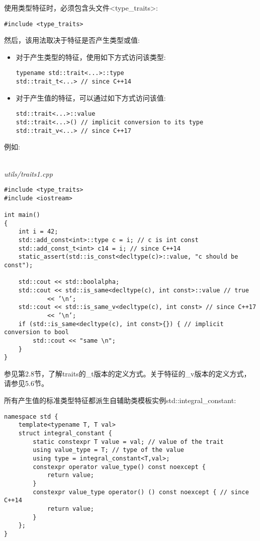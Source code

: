 
使用类型特征时，必须包含头文件<type\_traits>:

\begin{lstlisting}[style=styleCXX]
#include <type_traits>
\end{lstlisting}

然后，该用法取决于特征是否产生类型或值:

\begin{itemize}
\item 
对于产生类型的特征，使用如下方式访问该类型:
\begin{lstlisting}[style=styleCXX]
typename std::trait<...>::type
std::trait_t<...> // since C++14
\end{lstlisting}

\item 
对于产生值的特征，可以通过如下方式访问该值:
\begin{lstlisting}[style=styleCXX]
std::trait<...>::value
std::trait<...>() // implicit conversion to its type
std::trait_v<...> // since C++17
\end{lstlisting}
\end{itemize}

例如:

\hspace*{\fill} \\ %
\noindent
\textit{utils/traits1.cpp}
\begin{lstlisting}[style=styleCXX]
#include <type_traits>
#include <iostream>

int main()
{
	int i = 42;
	std::add_const<int>::type c = i; // c is int const
	std::add_const_t<int> c14 = i; // since C++14
	static_assert(std::is_const<decltype(c)>::value, "c should be const");
	
	std::cout << std::boolalpha;
	std::cout << std::is_same<decltype(c), int const>::value // true
			<< ’\n’;
	std::cout << std::is_same_v<decltype(c), int const> // since C++17
			<< ’\n’;
	if (std::is_same<decltype(c), int const>{}) { // implicit conversion to bool
		std::cout << "same \n";
	}
}
\end{lstlisting}

参见第2.8节，了解traits的\_t版本的定义方式。关于特征的\_v版本的定义方式，请参见5.6节。


所有产生值的标准类型特征都派生自辅助类模板实例std::integral\_constant:

\begin{lstlisting}[style=styleCXX]
namespace std {
	template<typename T, T val>
	struct integral_constant {
		static constexpr T value = val; // value of the trait
		using value_type = T; // type of the value
		using type = integral_constant<T,val>;
		constexpr operator value_type() const noexcept {
			return value;
		}
		constexpr value_type operator() () const noexcept { // since C++14
			return value;
		}
	};
}
\end{lstlisting}

